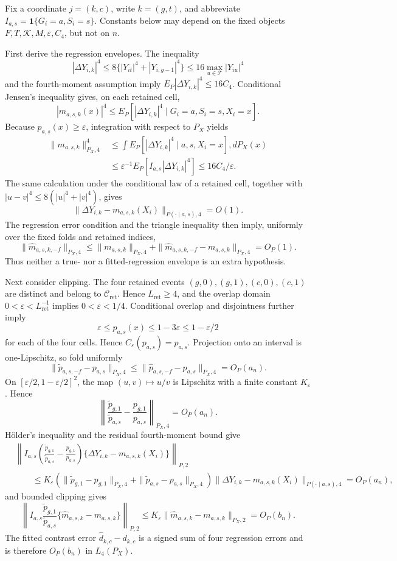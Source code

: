 Fix a coordinate \(j=(k,c)\), write \(k=(g,t)\), and abbreviate \(I_{a,s}=\mathbf 1\{G_i=a,S_i=s\}\). Constants below may depend on the fixed objects \(F,T,\mathcal K,M,\varepsilon,C_4\), but not on \(n\).

First derive the regression envelopes. The inequality
\[
 |\Delta Y_{i,k}|^4
 \le 8\{|Y_{it}|^4+|Y_{i,g-1}|^4\}
 \le16\max_{u\in\mathcal T}|Y_{iu}|^4
\]
and the fourth-moment assumption imply \(E_P|\Delta Y_{i,k}|^4\le16C_4\). Conditional Jensen's inequality gives, on each retained cell,
\[
 |m_{a,s,k}(x)|^4
 \le E_P[|\Delta Y_{i,k}|^4\mid G_i=a,S_i=s,X_i=x].
\]
Because \(p_{a,s}(x)\ge\varepsilon\), integration with respect to \(P_X\) yields
\[
\begin{aligned}
 \|m_{a,s,k}\|_{P_X,4}^4
 &\le \int E_P[|\Delta Y_{i,k}|^4\mid a,s,X_i=x],dP_X(x)\\
 &\le \varepsilon^{-1}E_P[I_{a,s}|\Delta Y_{i,k}|^4]
 \le16C_4/\varepsilon.
\end{aligned}
\]
The same calculation under the conditional law of a retained cell, together with \(|u-v|^4\le8(|u|^4+|v|^4)\), gives
\[
 \|\Delta Y_{i,k}-m_{a,s,k}(X_i)\|_{P(\cdot\mid a,s),4}=O(1).
\]
The regression error condition and the triangle inequality then imply, uniformly over the fixed folds and retained indices,
\[
 \|\widehat m_{a,s,k,-f}\|_{P_X,4}
 \le \|m_{a,s,k}\|_{P_X,4}
 +\|\widehat m_{a,s,k,-f}-m_{a,s,k}\|_{P_X,4}
 =O_P(1).
\]
Thus neither a true- nor a fitted-regression envelope is an extra hypothesis.

Next consider clipping. The four retained events \((g,0),(g,1),(c,0),(c,1)\) are distinct and belong to \(\mathcal C_{\mathrm{ret}}\). Hence \(L_{\mathrm{ret}}\ge4\), and the overlap domain \(0<\varepsilon<L_{\mathrm{ret}}^{-1}\) implies \(0<\varepsilon<1/4\). Conditional overlap and disjointness further imply
\[
 \varepsilon\le p_{a,s}(x)\le1-3\varepsilon
 \le1-\varepsilon/2
\]
for each of the four cells. Hence \(C_\varepsilon(p_{a,s})=p_{a,s}\). Projection onto an interval is one-Lipschitz, so fold uniformly
\[
 \|\widetilde p_{a,s,-f}-p_{a,s}\|_{P_X,4}
 \le\|\widehat p_{a,s,-f}-p_{a,s}\|_{P_X,4}=O_P(a_n).
\]
On \([\varepsilon/2,1-\varepsilon/2]^2\), the map \((u,v)\mapsto u/v\) is Lipschitz with a finite constant \(K_\varepsilon\). Hence
\[
 \left\|\frac{\widetilde p_{g,1}}{\widetilde p_{a,s}}
       -\frac{p_{g,1}}{p_{a,s}}\right\|_{P_X,4}=O_P(a_n).
\]
Hölder's inequality and the residual fourth-moment bound give
\[
\begin{aligned}
 &\left\|I_{a,s}\left(
 \frac{\widetilde p_{g,1}}{\widetilde p_{a,s}}
 -\frac{p_{g,1}}{p_{a,s}}\right)
 \{\Delta Y_{i,k}-m_{a,s,k}(X_i)\}\right\|_{P,2}\\
 &\qquad\le K_\varepsilon\left(
 \|\widetilde p_{g,1}-p_{g,1}\|_{P_X,4}
 +\|\widetilde p_{a,s}-p_{a,s}\|_{P_X,4}\right)
 \|\Delta Y_{i,k}-m_{a,s,k}(X_i)\|_{P(\cdot\mid a,s),4}
 =O_P(a_n),
\end{aligned}
\]
and bounded clipping gives
\[
 \left\|I_{a,s}\frac{\widetilde p_{g,1}}{\widetilde p_{a,s}}
 \{\widehat m_{a,s,k}-m_{a,s,k}\}\right\|_{P,2}
 \le K_\varepsilon\|\widehat m_{a,s,k}-m_{a,s,k}\|_{P_X,2}
 =O_P(b_n).
\]
The fitted contrast error \(\widehat d_{k,c}-d_{k,c}\) is a signed sum of four regression errors and is therefore \(O_P(b_n)\) in \(L_4(P_X)\).

